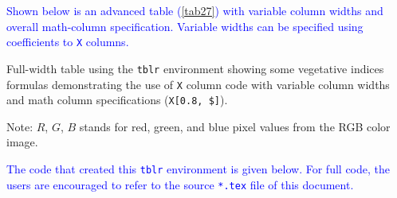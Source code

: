 \documentclass[phd]{ndsu-thesis-2022}
\newcommand\italk[1]{\textcolor{blue}{#1}}  %
\newcommand\vb[1]{\textcolor{blue}{\texttt{#1}}}%
\begin{document}
\italk{Shown below is an advanced table (\cref{tab27}) with variable column widths and overall math-column specification. Variable widths can be specified using coefficients to \vb{X} columns. 
}
\vspace{-4ex}
\begin{table}[ht]
\caption{Full-width table using the \texttt{tblr} environment showing some vegetative indices formulas demonstrating the use of \texttt{X} column code with variable column widths and math column specifications (\texttt{X[0.8, \$]}).}

\begin{tablenotes}[flushleft]
\footnotesize
\item \hspace{-1ex} Note: $R$, $G$, $B$ stands for red, green, and blue pixel values from the RGB color image.
\label{tab27}
\end{tablenotes}
\end{table}

\italk{The code that created this \vb{tblr} environment is given below. For full code, the users are encouraged to refer to the source \vb{*.tex} file of this document.}
\end{document}
